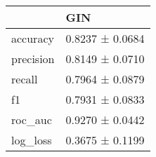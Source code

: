 \begin{tabular}{ll}
\toprule
 & GIN \\
\midrule
accuracy & 0.8237 ± 0.0684 \\
precision & 0.8149 ± 0.0710 \\
recall & 0.7964 ± 0.0879 \\
f1 & 0.7931 ± 0.0833 \\
roc_auc & 0.9270 ± 0.0442 \\
log_loss & 0.3675 ± 0.1199 \\
\bottomrule
\end{tabular}
